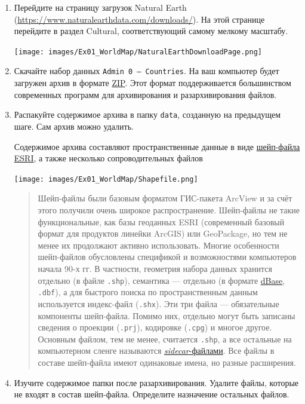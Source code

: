 \documentclass[
  12pt,
]{book}
\begin{document}
\begin{enumerate}
\def\labelenumi{\arabic{enumi}.}
\item
  Перейдите на страницу загрузок Natural Earth (\url{https://www.naturalearthdata.com/downloads/}). На этой странице перейдите в раздел Cultural, соответствующий самому мелкому масштабу.

  \texttt{[image: images/Ex01\_WorldMap/NaturalEarthDownloadPage.png]}
\item
  Скачайте набор данных \texttt{Admin\ 0\ –\ Countries}. На ваш компьютер будет загружен архив в формате \href{https://pkware.cachefly.net/webdocs/casestudies/APPNOTE.TXT}{ZIP}. Этот формат поддерживается большинством современных программ для архивирования и разархивирования файлов.
\item
  Распакуйте содержимое архива в папку \texttt{data}, созданную на предыдущем шаге. Сам архив можно удалить.

  Содержимое архива составляют пространственные данные в виде \protect\hyperlink{manual-dataformats-shapefile}{шейп-файла ESRI}, а также несколько сопроводительных файлов

  \texttt{[image: images/Ex01\_WorldMap/Shapefile.png]}

  \begin{quote}
  Шейп-файлы были базовым форматом ГИС-пакета ArcView и за счёт этого получили очень широкое распространение. Шейп-файлы не такие функциональные, как базы геоданных ESRI (современный базовый формат для продуктов линейки ArcGIS) или GeoPackage, но тем не менее их продолжают активно использовать. Многие особенности шейп-файлов обусловлены спецификой и возможностями компьютеров начала 90-х гг. В частности, геометрия набора данных хранится отдельно (в файле \texttt{.shp}), семантика --- отдельно (в формате \href{https://en.wikipedia.org/wiki/DBase}{dBase}, \texttt{.dbf}), а для быстрого поиска по пространственным данным используется индекс-файл (\texttt{.shx}). Эти три файла --- обязательные компоненты шейп-файла. Помимо них, отдельно могут быть записаны сведения о проекции (\texttt{.prj}), кодировке (\texttt{.cpg}) и многое другое. Основным файлом, тем не менее, считается \texttt{.shp}, а все остальные на компьютерном сленге называются \href{https://en.wikipedia.org/wiki/Sidecar_file}{\emph{sidecar}-файлами}. Все файлы в составе шейп-файла имеют одинаковые имена, но разные расширения.
  \end{quote}
\item
  Изучите содержимое папки после разархивирования. Удалите файлы, которые не входят в состав шейп-файла. Определите назначение остальных файлов.
\end{enumerate}
\end{document}
